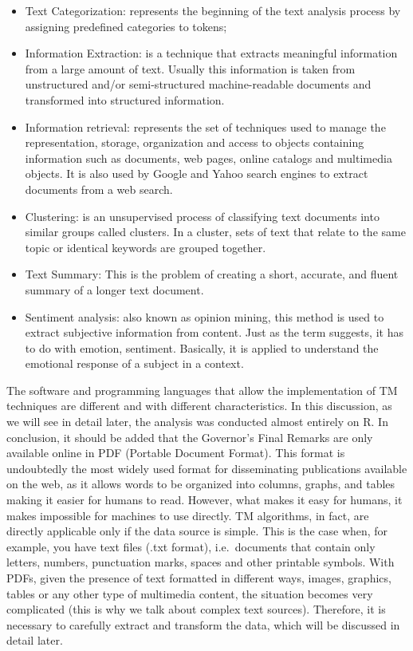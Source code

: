 \documentclass[
]{book}
\providecommand{\tightlist}{%
  \setlength{\itemsep}{0pt}\setlength{\parskip}{0pt}}
\begin{document}
\begin{itemize}
  \begin{itemize}
  \tightlist
  \item
    Text Categorization: represents the beginning of the text analysis process by assigning predefined categories to tokens;\\
  \item
    Information Extraction: is a technique that extracts meaningful information from a large amount of text. Usually this information is taken from unstructured and/or semi-structured machine-readable documents and transformed into structured information.\\
  \item
    Information retrieval: represents the set of techniques used to manage the representation, storage, organization and access to objects containing information such as documents, web pages, online catalogs and multimedia objects. It is also used by Google and Yahoo search engines to extract documents from a web search.\\
  \item
    Clustering: is an unsupervised process of classifying text documents into similar groups called clusters. In a cluster, sets of text that relate to the same topic or identical keywords are grouped together.\\
  \item
    Text Summary: This is the problem of creating a short, accurate, and fluent summary of a longer text document.\\
  \item
    Sentiment analysis: also known as opinion mining, this method is used to extract subjective information from content. Just as the term suggests, it has to do with emotion, sentiment. Basically, it is applied to understand the emotional response of a subject in a context.
  \end{itemize}
\end{itemize}

The software and programming languages that allow the implementation of TM techniques are different and with different characteristics. In this discussion, as we will see in detail later, the analysis was conducted almost entirely on R.
In conclusion, it should be added that the Governor's Final Remarks are only available online in PDF (Portable Document Format). This format is undoubtedly the most widely used format for disseminating publications available on the web, as it allows words to be organized into columns, graphs, and tables making it easier for humans to read. However, what makes it easy for humans, it makes impossible for machines to use directly.
TM algorithms, in fact, are directly applicable only if the data source is simple. This is the case when, for example, you have text files (.txt format), i.e.~documents that contain only letters, numbers, punctuation marks, spaces and other printable symbols. With PDFs, given the presence of text formatted in different ways, images, graphics, tables or any other type of multimedia content, the situation becomes very complicated (this is why we talk about complex text sources). Therefore, it is necessary to carefully extract and transform the data, which will be discussed in detail later.
\end{document}

